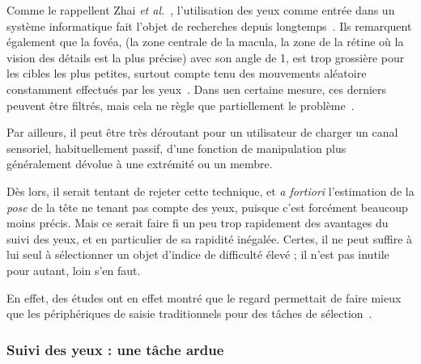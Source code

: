 	
	Comme le rappellent Zhai \emph{et al.}~\cite{zhai1999manual}, l'utilisation des yeux comme entrée dans un système informatique fait l'objet de recherches depuis longtemps~\cite{levine1981eye, bolt1982eyes, ware1987evaluation, jacob1990you}. Ils remarquent également que la fovéa, (la zone centrale de la macula, la zone de la rétine où la vision des détails est la plus précise) avec son angle de 1\textdegree{}, est trop grossière pour les cibles les plus petites, surtout compte tenu des mouvements aléatoire constamment effectués par les yeux~\cite{monden2005evaluation, vspakov2011comparison}. Dans uen certaine mesure, ces derniers peuvent être filtrés, mais cela ne règle que partiellement le problème~\cite{zhang2008improving}.
	
	Par ailleurs, il peut être très déroutant pour un utilisateur de \og charger \fg{} un canal sensoriel, habituellement passif\footnotemark{}, d'une fonction de manipulation plus généralement dévolue à une extrémité ou un membre.
	
	
	Dès lors, il serait tentant de rejeter cette technique, et \emph{a fortiori} l'estimation de la \emph{pose} de la tête ne tenant pas compte des yeux, puisque c'est forcément beaucoup moins précis. Mais ce serait faire fi un peu trop rapidement des avantages du suivi des yeux, et en particulier de sa rapidité inégalée. Certes, il ne peut suffire à lui seul à sélectionner un objet d'indice de difficulté élevé ; il n'est pas inutile pour autant, loin s'en faut.

	En effet, des études ont en effet montré que le regard permettait de faire mieux que les périphériques de saisie traditionnels pour des tâches de sélection~\cite{stellmach2012look, ware1987evaluation, smith2000hand, bieg2010eye}.
	
	\subsubsection{Suivi des yeux : une tâche ardue}

